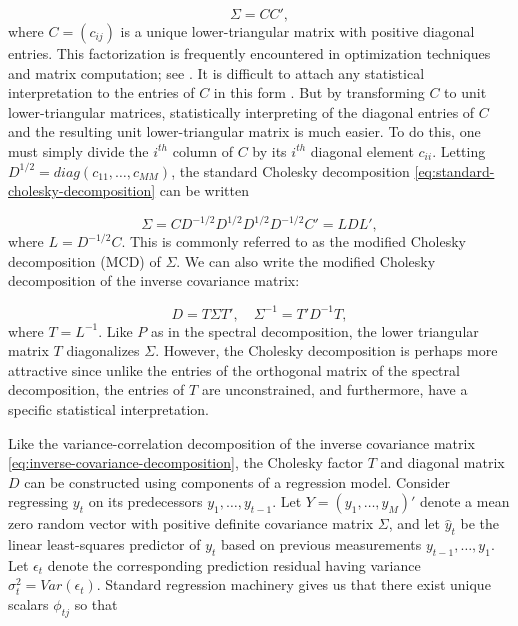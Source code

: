 \begin{equation}\label{eq:standard-cholesky-decomposition}
\Sigma = CC',
\end{equation}
\noindent
where $C = \left(c_{ij} \right)$ is a unique lower-triangular matrix with positive diagonal entries. This factorization is frequently encountered in optimization techniques and matrix computation; see \cite{golub2012matrix}. It is difficult to attach any statistical interpretation to the entries of $C$ in this form \cite{pinheiro1996unconstrained}. But by transforming $C$ to unit lower-triangular matrices, statistically interpreting of the diagonal entries of $C$ and the resulting unit lower-triangular matrix is much easier. To do this, one must simply divide the $i^{th}$ column of $C$ by its $i^{th}$ diagonal element $c_{ii}$. Letting $D^{1/2} = diag\left( c_{11},\dots, c_{MM} \right)$, the standard Cholesky decomposition \ref{eq:standard-cholesky-decomposition} can be written

\begin{equation}\label{eq:standard-cholesky-decomposition-transform}
\Sigma = CD^{-1/2}D^{1/2} D^{1/2} D^{-1/2}C' = L D L',
\end{equation}
\noindent
where $L = D^{-1/2}C$. This is commonly referred to as the modified Cholesky decomposition (MCD) of $\Sigma$. We can also write the modified Cholesky decomposition of the inverse covariance matrix:

\begin{equation}\label{eq:modified-cholesky-decomposition}
D = T\Sigma T', \quad \Sigma^{-1} = T'D^{-1} T,
\end{equation}
 \noindent
where $T = L^{-1}$. Like $P$ as in the spectral decomposition, the lower triangular matrix $T$ diagonalizes $\Sigma$. However, the Cholesky decomposition is perhaps more attractive since unlike the entries of the orthogonal matrix of the spectral decomposition, the entries of $T$ are unconstrained, and furthermore, have a specific statistical interpretation.

\bigskip

Like the variance-correlation decomposition of the inverse covariance matrix \ref{eq:inverse-covariance-decomposition}, the Cholesky factor $T$ and diagonal matrix $D$ can be constructed using components of a regression model. Consider regressing $y_t$ on its predecessors $y_1, \dots, y_{t-1}$. Let $Y = \left( y_1,\dots, y_M \right)'$ denote a mean zero random vector with positive definite covariance matrix $\Sigma$, and let $\hat{y}_t$ be the linear least-squares predictor of $y_t$ based on previous measurements $y_{t-1}, \dots , y_1$. Let  $\epsilon_t$ denote the corresponding prediction residual having variance  $\sigma_t^2 = Var\left(\epsilon_t\right)$. Standard regression machinery gives us that there exist unique scalars $\phi_{tj}$ so that

